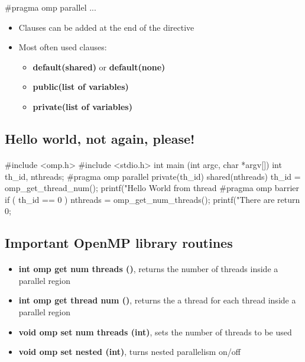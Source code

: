 \documentclass[%
oneside,                 %
final,                   %
10pt]{article}
\begin{document}
\noindent
\bcppcod
#pragma omp parallel { ... }
\ecppcod
\begin{itemize}
\item Clauses can be added at the end of the directive

\item Most often used clauses:
\begin{itemize}

 \item \textbf{default(shared)} or \textbf{default(none)}

 \item \textbf{public(list of variables)}

 \item \textbf{private(list of variables)}
\end{itemize}

\noindent
\end{itemize}

\noindent



\subsection{Hello world, not again, please!}

\paragraph{}
\bcppcod
#include <omp.h>
#include <stdio.h>
int main (int argc, char *argv[])
{
int th_id, nthreads;
#pragma omp parallel private(th_id) shared(nthreads)
{
th_id = omp_get_thread_num();
printf("Hello World from thread %
#pragma omp barrier
if ( th_id == 0 ) {
nthreads = omp_get_num_threads();
printf("There are %
}
}
return 0;
}
\ecppcod



\subsection{Important OpenMP library routines}

\paragraph{}

\begin{itemize}
\item \textbf{int omp get num threads ()}, returns the number of threads inside a parallel region

\item \textbf{int omp get thread num ()},  returns the  a thread for each thread inside a parallel region

\item \textbf{void omp set num threads (int)}, sets the number of threads to be used

\item \textbf{void omp set nested (int)},  turns nested parallelism on/off
\end{itemize}
\end{document}
